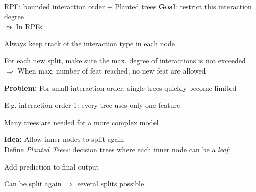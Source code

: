 \documentclass[10pt,compress,t,notes=noshow, xcolor=table]{beamer}
\begin{document}
\begin{framev}[align=top]{RPF: bounded interaction order + Planted trees}
\textbf{Goal}: restrict this interaction degree\\
$\leadsto$ In RPFs:
\begin{itemizeM}
\item Always keep track of the interaction type in each node
\item For each new split, make sure the max. degree of interactions is not exceeded\\ $\Rightarrow$ When max. number of feat reached, no new feat are allowed
\end{itemizeM}
\spacer[0.25]
\textbf{Problem:} For small interaction order, single trees quickly become limited
\begin{itemizeM}
\item E.g. interaction order 1: every tree uses only one feature
\item[$\Rightarrow$] Many trees are needed for a more complex model
\end{itemizeM}

\spacer[0.25]
\textbf{Idea:} Allow inner nodes to split again\\
\spacer[0.25]
Define \textit{Planted Trees}: decision trees where each inner node can be a \textit{leaf}:
\begin{itemizeM}
\item Add prediction to final output
\item Can be split again $\Rightarrow$ several splits possible
\end{itemizeM}
\end{framev}



\end{document}
